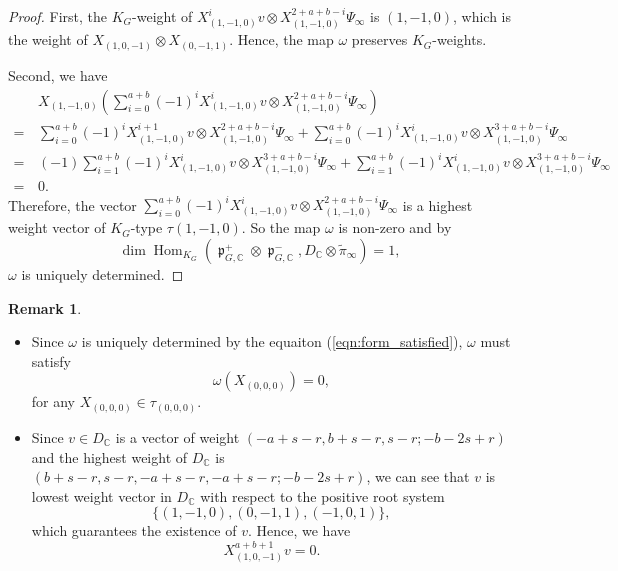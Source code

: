\documentclass[11pt, a4paper]{amsart}
\theoremstyle{plain}
\theoremstyle{definition}
\newtheorem{remark}[theorem]{Remark}
\numberwithin{equation}{section}
\def\CC{\mathbb{C}}
\DeclareMathOperator{\Hom}{Hom}
\DeclareMathOperator{\liep}{\mathfrak p}
\begin{document}
\begin{proof}
    First, the $K_{G}$-weight of $X_{(1, -1 ,0)}^{i} v \otimes X^{2 + a + b - i}_{(1, -1, 0)} \Psi_{\infty}$ is $(1, -1, 0)$, which is the weight of $X_{(1, 0, -1)} \otimes X_{(0, -1, 1)}$. Hence, the map $\omega$ preserves $K_{G}$-weights. 
    \par Second, we have 
       \begin{align*}
           & X_{(1, -1, 0)}(\sum\limits_{i = 0}^{a + b} (-1)^{i} X_{(1, -1 ,0)}^{i} v \otimes X^{2 + a + b - i}_{(1, -1, 0)} \Psi_{\infty} ) \\
           =  & \sum\limits_{i = 0}^{a + b}(-1)^{i} X_{(1, -1 ,0)}^{i + 1} v \otimes X^{2 + a + b - i}_{(1, -1, 0)} \Psi_{\infty}  
           + \sum\limits_{i = 0}^{a + b}(-1)^{i} X_{(1, -1 ,0)}^{i} v \otimes X^{3 + a + b - i}_{(1, -1, 0)} \Psi_{\infty}  \\
           = \,  & (-1)\sum\limits_{i = 1}^{a + b}(-1)^{i} X_{(1, -1 ,0)}^{i} v \otimes X^{3 + a + b - i}_{(1, -1, 0)} \Psi_{\infty}
             + \sum\limits_{i = 1}^{a + b}(-1)^{i} X_{(1, -1 ,0)}^{i} v \otimes X^{3 + a + b - i}_{(1, -1, 0)} \Psi_{\infty} \\
           = \,  & 0. 
       \end{align*}
    Therefore, the vector $\sum\limits_{i = 0}^{a + b} (-1)^{i} X_{(1, -1 ,0)}^{i} v \otimes X^{2 + a + b - i}_{(1, -1, 0)} \Psi_{\infty}$ is a highest weight vector of $K_G$-type $\tau(1, -1, 0)$. So the map $\omega$ is non-zero and by 
    \begin{equation*}
        \dim \Hom_{K_G}(\liep^{+}_{G, \CC} \otimes \liep^{-}_{G, \CC}, D_{\CC} \otimes \tilde{\pi}_{\infty}) = 1, 
    \end{equation*}
    $\omega$ is uniquely determined. 
\end{proof}

\begin{remark}
    \begin{itemize}
        \item  Since $\omega$ is uniquely determined by the equaiton (\ref{eqn:form_satisfied}), $\omega$ must satisfy
                \begin{equation*}
                    \omega(X_{(0, 0, 0)}) = 0,
                \end{equation*}
                for any $X_{(0, 0, 0)} \in \tau_{(0, 0, 0)}$. 
        \item Since $v \in D_{\CC}$ is a vector of weight $(-a + s - r, b + s - r, s - r; -b - 2s + r)$ and the highest weight of $D_{\CC}$ is $(b + s - r, s - r, -a + s - r, -a + s - r; -b -2s + r)$, we can see that $v$ is lowest weight vector in $D_{\CC}$ with respect to the positive root system 
        \begin{equation*}
            \{ (1, -1, 0), (0, -1, 1), (-1, 0, 1) \},
        \end{equation*}
        which guarantees the existence of $v$. 
        Hence, we have 
        \begin{equation}
        \label{eq: Xv = 0}
            X_{(1, 0, -1)}^{a + b + 1}v = 0. 
        \end{equation}
    \end{itemize}
\end{remark}
\end{document}
